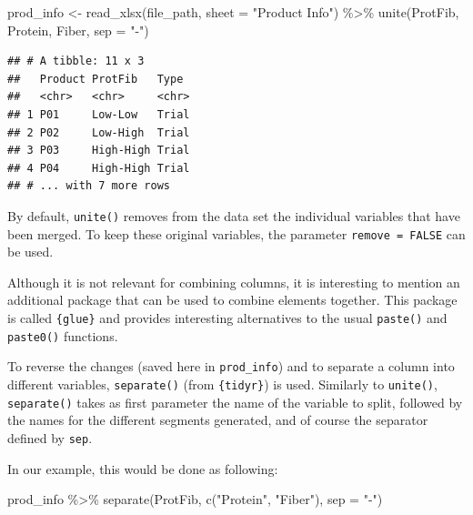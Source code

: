 \documentclass[
]{krantz}
\makeatletter
\newenvironment{Shaded}{\begin{snugshade}}{\end{snugshade}}
\newcommand{\AttributeTok}[1]{\textcolor[rgb]{0.61,0.61,0.61}{#1}}
\newcommand{\FunctionTok}[1]{\textcolor[rgb]{0,0,0}{#1}}
\newcommand{\NormalTok}[1]{#1}
\newcommand{\OtherTok}[1]{\textcolor[rgb]{0.37,0.37,0.37}{#1}}
\newcommand{\SpecialCharTok}[1]{\textcolor[rgb]{0,0,0}{#1}}
\newcommand{\StringTok}[1]{\textcolor[rgb]{0.5,0.5,0.5}{#1}}
\renewenvironment{quote}{\begin{VF}}{\end{VF}}
\newenvironment{kframe}{%
\medskip{}
\setlength{\fboxsep}{.8em}
 \def\at@end@of@kframe{}%
 \ifinner\ifhmode%
  \def\at@end@of@kframe{\end{minipage}}%
  \begin{minipage}{\columnwidth}%
 \fi\fi%
 \def\FrameCommand##1{\hskip\@totalleftmargin \hskip-\fboxsep
 \colorbox{shadecolor}{##1}\hskip-\fboxsep
     \hskip-\linewidth \hskip-\@totalleftmargin \hskip\columnwidth}%
 \MakeFramed {\advance\hsize-\width
   \@totalleftmargin\z@ \linewidth\hsize
   \@setminipage}}%
 {\par\unskip\endMakeFramed%
 \at@end@of@kframe}
\renewenvironment{Shaded}{\begin{kframe}}{\end{kframe}}
\makeatother
\begin{document}
\begin{Shaded}
\begin{Highlighting}[]
\NormalTok{prod\_info }\OtherTok{\textless{}{-}} \FunctionTok{read\_xlsx}\NormalTok{(file\_path, }\AttributeTok{sheet =} \StringTok{"Product Info"}\NormalTok{) }\SpecialCharTok{\%\textgreater{}\%}
  \FunctionTok{unite}\NormalTok{(ProtFib, Protein, Fiber, }\AttributeTok{sep =} \StringTok{"{-}"}\NormalTok{)}
\end{Highlighting}
\end{Shaded}

\begin{verbatim}
## # A tibble: 11 x 3
##   Product ProtFib   Type 
##   <chr>   <chr>     <chr>
## 1 P01     Low-Low   Trial
## 2 P02     Low-High  Trial
## 3 P03     High-High Trial
## 4 P04     High-High Trial
## # ... with 7 more rows
\end{verbatim}

By default, \texttt{unite()} removes from the data set the individual variables that have been merged. To keep these original variables, the parameter \texttt{remove\ =\ FALSE} can be used.

\begin{quote}
Although it is not relevant for combining columns, it is interesting to mention an additional package that can be used to combine elements together. This package is called \texttt{\{glue\}} and provides interesting alternatives to the usual \texttt{paste()} and \texttt{paste0()} functions.
\end{quote}

To reverse the changes (saved here in \texttt{prod\_info}) and to separate a column into different variables, \texttt{separate()} (from \texttt{\{tidyr\}}) is used. Similarly to \texttt{unite()}, \texttt{separate()} takes as first parameter the name of the variable to split, followed by the names for the different segments generated, and of course the separator defined by \texttt{sep}.

In our example, this would be done as following:

\begin{Shaded}
\begin{Highlighting}[]
\NormalTok{prod\_info }\SpecialCharTok{\%\textgreater{}\%}
  \FunctionTok{separate}\NormalTok{(ProtFib, }\FunctionTok{c}\NormalTok{(}\StringTok{"Protein"}\NormalTok{, }\StringTok{"Fiber"}\NormalTok{), }\AttributeTok{sep =} \StringTok{"{-}"}\NormalTok{)}
\end{Highlighting}
\end{Shaded}
\end{document}
